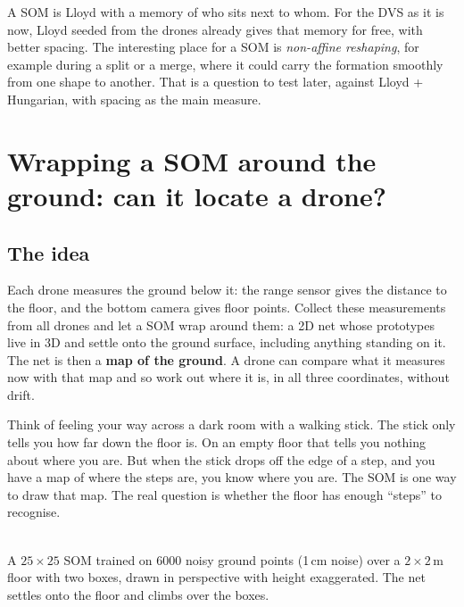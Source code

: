 \documentclass[11pt,a4paper]{article}
\begin{document}
\begin{plainbox}
A SOM is Lloyd with a memory of who sits next to whom. For the DVS as it is now, Lloyd seeded from the drones already
gives that memory for free, with better spacing. The interesting place for a SOM is \emph{non-affine reshaping}, for
example during a split or a merge, where it could carry the formation smoothly from one shape to another. That is a
question to test later, against Lloyd + Hungarian, with spacing as the main measure.
\end{plainbox}

\section{Wrapping a SOM around the ground: can it locate a drone?}\label{sec:ground}

\subsection{The idea}
Each drone measures the ground below it: the range sensor gives the distance to the floor, and the bottom camera
gives floor points. Collect these measurements from all drones and let a SOM wrap around them: a 2D net whose
prototypes live in 3D and settle onto the ground surface, including anything standing on it. The net is then a
\textbf{map of the ground}. A drone can compare what it measures now with that map and so work out where it is,
in all three coordinates, without drift.

\begin{plainbox}
Think of feeling your way across a dark room with a walking stick. The stick only tells you how far down the floor
is. On an empty floor that tells you nothing about where you are. But when the stick drops off the edge of a step,
and you have a map of where the steps are, you know where you are. The SOM is one way to draw that map. The real
question is whether the floor has enough ``steps'' to recognise.
\end{plainbox}

\begin{center}
\\
\small A $25\times25$ SOM trained on 6000 noisy ground points (1\,cm noise) over a $2\times2$\,m floor with two
boxes, drawn in perspective with height exaggerated. The net settles onto the floor and climbs over the boxes.
\end{center}
\end{document}
